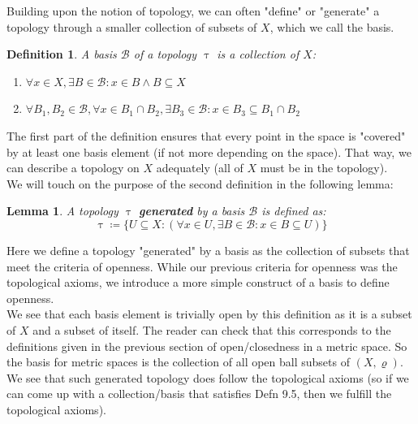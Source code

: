 \documentclass{article}
\newtheorem{lem}{Lemma}[section]
\newtheorem{defn}{Definition}[section]
\begin{document}
Building upon the notion of topology, we can often "define" or "generate" a topology through a smaller collection of subsets of $X$, which we call the basis.
\begin{defn}
    A basis $\mathcal{B}$ of a topology $\uptau$ is a collection of $X$:
    \begin{enumerate}
        \item $\forall x \in X, \exists B \in \mathcal{B}: x \in B \land B \subseteq X$
        \item $\forall B_1, B_2 \in \mathcal{B}, \forall x \in B_1 \cap B_2, \exists B_3 \in \mathcal{B}: x \in B_3 \subseteq B_1 \cap B_2$
    \end{enumerate}
\end{defn}
The first part of the definition ensures that every point in the space is "covered" by at least one basis element (if not more depending on the space). That way, we can describe a topology on $X$ adequately (all of $X$ must be in the topology).\\

We will touch on the purpose of the second definition in the following lemma:
\begin{lem}
    A topology $\uptau$ \textbf{generated} by a basis $\mathcal{B}$ is defined as:
    \begin{equation*}
        \uptau \coloneq \{U \subseteq X: (\forall x \in U, \exists B \in \mathcal{B}: x \in B \subseteq U)\}
    \end{equation*}
\end{lem}
Here we define a topology "generated" by a basis as the collection of subsets that meet the criteria of openness. While our previous criteria for openness was the topological axioms, we introduce a more simple construct of a basis to define openness.\\

We see that each basis element is trivially open by this definition as it is a subset of $X$ and a subset of itself. The reader can check that this corresponds to the definitions given in the previous section of open/closedness in a metric space. So the basis for metric spaces is the collection of all open ball subsets of $(X, \varrho)$.\\

We see that such generated topology does follow the topological axioms (so if we can come up with a collection/basis that satisfies Defn 9.5, then we fulfill the topological axioms).\\
\end{document}
